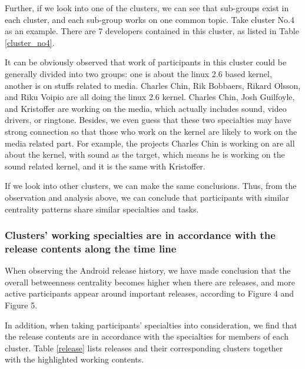 \documentclass[10pt, conference, compsocconf]{IEEEtran}
\begin{document}
Further, if we look into one of the clusters, we can see that sub-groups exist in each cluster, and each sub-group works on one common topic. Take cluster No.4 as an example. There are 7 developers contained in this cluster, as listed in Table \ref{cluster_no4}.

It can be obviously observed that work of participants in this cluster could be generally divided into two groups: one is about the linux 2.6 based kernel, another is on stuffs related to media. Charles Chin, Rik Bobbaers, Rikard Olsson, and Riku Voipio are all doing the linux 2.6 kernel. Charles Chin, Josh Guilfoyle, and Kristoffer are working on the media, which actually includes sound, video drivers, or ringtone. Besides, we even guess that these two specialties may have strong connection so that those who work on the kernel are likely to work on the media related part. For example, the projects Charles Chin is working on are all about the kernel, with sound as the target, which means he is working on the sound related kernel, and it is the same with Kristoffer.

If we look into other clusters, we can make the same conclusions.
Thus, from the observation and analysis above, we can conclude that participants with similar centrality patterns share similar specialties and tasks.

\subsubsection{Clusters' working specialties are in accordance with the release contents along the time line}

When observing the Android release history, we have made conclusion that the overall betweenness centrality becomes higher when there are releases, and more active participants appear around important releases, according to Figure 4 and Figure 5.

In addition, when taking participants' specialties into consideration, we find that the release contents are in accordance with the specialties for members of each cluster. Table \ref{release} lists releases and their corresponding clusters together with the highlighted working contents.
\end{document}
